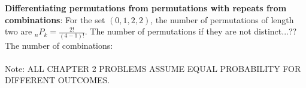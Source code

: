 \textbf{Differentiating permutations from permutations with repeats from combinations}:
For the set $(0, 1, 2, 2)$, the number of permutations of length two are ${_n}P_k = \frac{2!}{(4-1)!}$.
The number of permutations if they are not distinct...??
The number of combinations:  \hfill \\
\hfill \\

Note: ALL CHAPTER 2 PROBLEMS ASSUME EQUAL PROBABILITY FOR DIFFERENT OUTCOMES.
	

  

    
    
    
    
    
    
    
    
    
